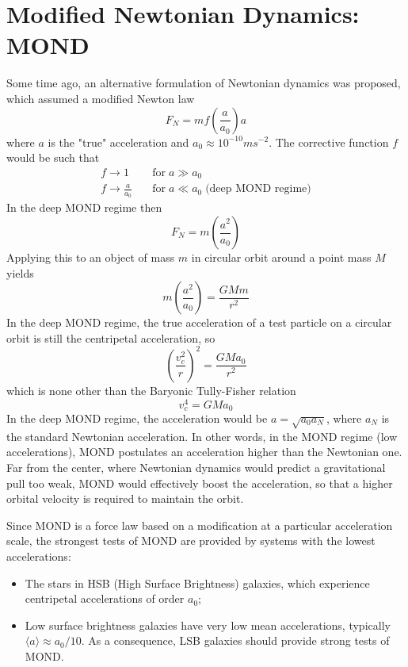 \section*{Modified Newtonian Dynamics: MOND}

Some time ago, an alternative formulation of Newtonian dynamics was proposed, which assumed a modified Newton law
\begin{equation*}
    F_{N} = mf\left(\frac{a}{a_{0}}\right)a
\end{equation*}
where $a$ is the "true" acceleration and $a_{0}\approx 10^{-10}\unit{m}\unit{s}^{-2}$. The corrective function $f$ would be such that 
\begin{align*}
    f\to 1 \quad &\text{for} \; a \gg a_{0}\\
    f \to \frac{a}{a_{0}} \quad &\text{for} \; a \ll a_{0} \;\text{(deep MOND regime)}
\end{align*}
In the deep MOND regime then
\begin{equation*}
    F_{N} = m\left(\frac{a^{2}}{a_{0}}\right)
\end{equation*}
Applying this to an object of mass $m$ in circular orbit around a point mass $M$ yields
\begin{equation*}
    m\left(\frac{a^{2}}{a_{0}}\right) = \frac{GMm}{r^{2}}
\end{equation*}
In the deep MOND regime, the true acceleration of a test particle on a circular orbit is still the centripetal acceleration, so
\begin{equation*}
    \left(\frac{v_{c}^{2}}{r}\right)^{2} = \frac{GMa_{0}}{r^{2}}
\end{equation*}
which is none other than the Baryonic Tully-Fisher relation
\begin{equation}
    v_{c}^{4} = GMa_{0}
    \label{eq:MOND_TF}
\end{equation}
In the deep MOND regime, the acceleration would be $a = \sqrt{a_{0}a_{N}}$, where $a_{N}$ is the standard Newtonian acceleration. In other words, in the MOND regime (low accelerations), MOND postulates an acceleration higher than the Newtonian one. Far from the center, where Newtonian dynamics would predict a gravitational pull too weak, MOND would effectively boost the acceleration, so that a higher orbital velocity is required to maintain the orbit.
\par Since MOND is a force law based on a modification at a particular acceleration scale, the strongest tests of MOND are provided by systems with the lowest accelerations:
\begin{itemize}
    \item The stars in HSB (High Surface Brightness) galaxies, which experience centripetal accelerations of order $a_{0}$;
    \item Low surface brightness galaxies have very low mean accelerations, typically $\langle a \rangle \approx a_{0}/10$. As a consequence, LSB galaxies should provide strong tests of MOND.
\end{itemize}
